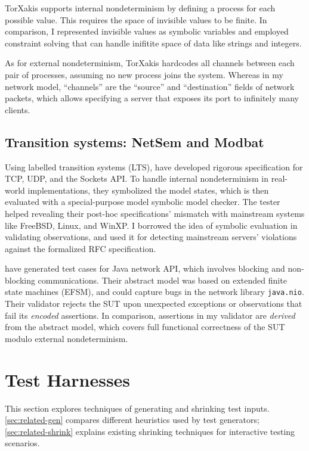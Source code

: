 TorXakis supports internal nondeterminism by defining a process for each
possible value.  This requires the space of invisible values to be finite.  In
comparison, I represented invisible values as symbolic variables and employed
constraint solving that can handle inifitite space of data like strings and
integers.

As for external nondeterminism, TorXakis hardcodes all channels between each
pair of processes, assuming no new process joins the system.  Whereas in my
network model, ``channels'' are the ``source'' and ``destination'' fields of
network packets, which allows specifying a server that exposes its port to
infinitely many clients.

\subsection{Transition systems: NetSem and Modbat}
Using labelled transition systems (LTS), \citet{netsem} have developed rigorous
specification for TCP, UDP, and the Sockets API.  To handle internal
nondeterminism in real-world implementations, they symbolized the model states,
which is then evaluated with a special-purpose model symbolic model checker.
The tester helped revealing their post-hoc specifications' mismatch with
mainstream systems like FreeBSD, Linux, and WinXP.  I borrowed the idea of
symbolic evaluation in validating observations, and used it for detecting
mainstream servers' violations against the formalized RFC specification.

\citet{modbat} have generated test cases for Java network API, which involves
blocking and non-blocking communications.  Their abstract model was based on
extended finite state machines (EFSM), and could capture bugs in the network
library \verb|java.nio|.  Their validator rejects the SUT upon unexpected
exceptions or observations that fail its {\em encoded} assertions.  In
comparison, assertions in my validator are {\em derived} from the abstract
model, which covers full functional correctness of the SUT modulo external
nondeterminism.

\section{Test Harnesses}
\label{sec:related-harness}
This section explores techniques of generating and shrinking test inputs.
\autoref{sec:related-gen} compares different heuristics used by test generators;
\autoref{sec:related-shrink} explains existing shrinking techniques for
interactive testing scenarios.

